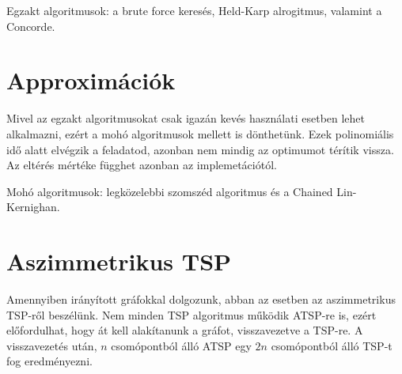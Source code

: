 Egzakt algoritmusok: a brute force keresés, Held-Karp alrogitmus, valamint a Concorde.

\section{Approximációk}\label{sec:ALAP:adatelem}

Mivel az egzakt algoritmusokat csak igazán kevés használati esetben lehet alkalmazni, ezért a mohó algoritmusok mellett is dönthetünk. Ezek polinomiális idő alatt elvégzik a feladatod, azonban nem mindig az optimumot térítik vissza. Az eltérés mértéke függhet azonban az implemetációtól.

Mohó algoritmusok: legközelebbi szomszéd algoritmus és a Chained Lin-Kernighan.

\section{Aszimmetrikus TSP}\label{sec:ALAP:adatelem}

Amennyiben irányított gráfokkal dolgozunk, abban az esetben az aszimmetrikus TSP-ről beszélünk. Nem minden TSP algoritmus működik ATSP-re is, ezért előfordulhat, hogy át kell alakítanunk a gráfot, visszavezetve a TSP-re. A visszavezetés után, \(n\) csomópontból álló ATSP egy \(2n\) csomópontból álló TSP-t fog eredményezni.